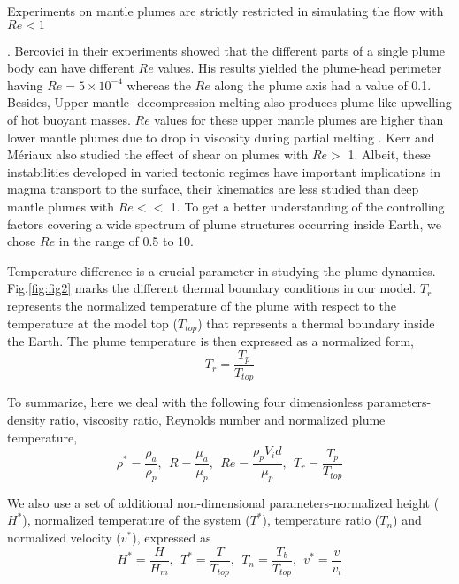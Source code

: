 \documentclass[12pt]{article}
\begin{document}
Experiments on mantle plumes are strictly restricted in simulating the flow with $Re<1$ {\cite{whitehead1982instabilities}. Bercovici \cite{bercovici1992wave} in their experiments showed that the different parts of a single plume body can have different $Re$ values. His results yielded the plume-head perimeter having $Re =5\times10^{-4}$ whereas 
the $Re$ along the plume axis had a value of 0.1. Besides, Upper mantle- decompression melting also produces plume-like upwelling of hot buoyant masses. $Re$ values for these upper mantle plumes are higher than lower mantle plumes due to drop in viscosity during partial melting \cite{turcotte1987physics}. Kerr and M\'eriaux \cite{kerr2004structure} also studied the effect of shear on plumes with $Re>$ 1. Albeit, these instabilities developed in varied tectonic regimes have important implications in magma transport to the surface, their kinematics are less studied than deep mantle plumes with $Re <<$ 1. To get a better understanding of the controlling factors covering a wide spectrum of plume structures occurring inside Earth, we chose $Re$ in the range of 0.5 to 10.


Temperature difference is a crucial parameter in studying the plume dynamics. Fig.\ref{fig:fig2} 
marks the different thermal boundary conditions in our model. $T_r$ represents the normalized 
temperature of the plume with respect to the temperature at the model top ($T_{top}$) that represents a thermal boundary inside the Earth. 
The plume temperature is then expressed as a normalized form, 
\begin{equation}
T_r = \frac {T_p}{T_{top}}
\label{eqn:plume_temp}
\end{equation}

To summarize, here we deal with the following four dimensionless parameters- density ratio, viscosity ratio, Reynolds number and normalized plume temperature, 
\begin{equation}
\rho^*=\frac {\rho_a}{\rho_p},~~ R=\frac {\mu_a}{\mu_p},~~ Re = \frac {\rho_p V_i d}{\mu_p},~~ T_r = \frac {T_p}{T_{top}}
\label{eqn:norm1}
\end{equation}

We also use a set of additional non-dimensional parameters-normalized 
height ($H^*$), normalized temperature of the system ($T^*$), temperature ratio ($T_n$) 
and normalized velocity ($v^*$), expressed as
\begin{equation}
H^*=\frac {H}{H_m},~~ T^*=\frac {T}{T_{top}},~~ T_n = \frac {T_b}{T_{top}},~~ v^* = \frac {v}{v_i}
\label{eqn:norm2}
\end{equation}


}
\end{document}
